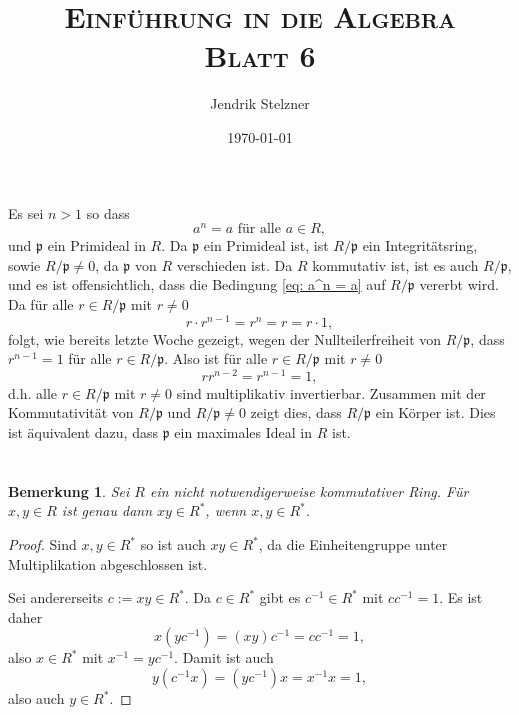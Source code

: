 \documentclass[a4paper,10pt]{article}
\title{\textsc{Einführung in die Algebra \\ \Large Blatt 6}}
\author{Jendrik Stelzner}
\date{\today}
\newcounter{satze}
\newtheorem{bem}[satze]{Bemerkung}
\newcommand{\mf}[1]{\mathfrak{#1}}
\begin{document}
\maketitle





\section{}
Es sei $n > 1$ so dass
\begin{equation}\label{eq: a^n = a}
 a^n = a \text{ für alle } a \in R,
\end{equation}
und $\mf{p}$ ein Primideal in $R$. Da $\mf{p}$ ein Primideal ist, ist $R/\mf{p}$ ein Integritätsring, sowie $R/\mf{p} \neq 0$, da $\mf{p}$ von $R$ verschieden ist. Da $R$ kommutativ ist, ist es auch $R/\mf{p}$, und es ist offensichtlich, dass die Bedingung \eqref{eq: a^n = a} auf $R/\mf{p}$ vererbt wird. Da für alle $r \in R/\mf{p}$ mit $r \neq 0$
\[
 r \cdot r^{n-1} = r^n = r = r \cdot 1,
\]
folgt, wie bereits letzte Woche gezeigt, wegen der Nullteilerfreiheit von $R/\mf{p}$, dass $r^{n-1} = 1$ für alle $r \in R/\mf{p}$. Also ist für alle $r \in R/\mf{p}$ mit $r \neq 0$
\[
 r r^{n-2} = r^{n-1} = 1,
\]
d.h. alle $r \in R/\mf{p}$ mit $r \neq 0$ sind multiplikativ invertierbar. Zusammen mit der Kommutativität von $R/\mf{p}$ und $R/\mf{p} \neq 0$ zeigt dies, dass $R/\mf{p}$ ein Körper ist. Dies ist äquivalent dazu, dass $\mf{p}$ ein maximales Ideal in $R$ ist.





\section{}

\begin{bem}\label{bem: produkt in Einheitengruppe}
 Sei $R$ ein nicht notwendigerweise kommutativer Ring. Für $x,y \in R$ ist genau dann $xy \in R^*$, wenn $x,y \in R^*$.
\end{bem}
\begin{proof}
 Sind $x,y \in R^*$ so ist auch $xy \in R^*$, da die Einheitengruppe unter Multiplikation abgeschlossen ist.
 
 Sei andererseits $c := xy \in R^*$. Da $c \in R^*$ gibt es $c^{-1} \in R^*$ mit $c c^{-1} = 1$. Es ist daher
 \[
  x (yc^{-1}) = (xy) c^{-1} = c c^{-1} = 1,
 \]
 also $x \in R^*$ mit $x^{-1} = yc^{-1}$. Damit ist auch
 \[
  y(c^{-1} x) = (y c^{-1}) x =  x^{-1} x = 1,
 \]
 also auch $y \in R^*$.
\end{proof}
\end{document}
